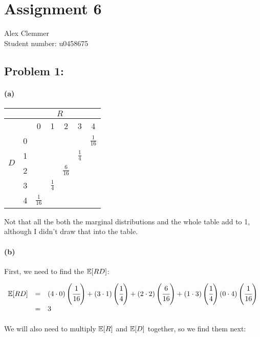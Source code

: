 \documentclass[a4paper]{article}
\begin{document}
\section*{Assignment 6}
Alex Clemmer\\
Student number: u0458675

\subsection*{Problem 1:} 

\paragraph{(a)} 

\renewcommand\arraystretch{1.5}
\begin{tabular}{ c | c | c | c | c | c | c}
& \multicolumn{6}{c}{$R$} \\
\hline
\multirow{7}{*}{$D$} & & 0 & 1 & 2 & 3 & 4 \\
\cline{2-7}
& 0 & & & & & $\frac{1}{16}$ \\
\cline{2-7}
& 1 & & & & $\frac{1}{4}$ & \\
\cline{2-7}
& 2 & & & $\frac{6}{16}$ & & \\
\cline{2-7}
& 3 & & $\frac{1}{4}$ & & & \\
\cline{2-7}
& 4 & $\frac{1}{16}$ & & & & \\
\end{tabular}

Not that all the both the marginal distributions and the whole table add to 1, although I didn't draw that into the table.

\paragraph{(b)}

First, we need to find the $\mathbb{E}[RD]$:

\begin{equation}
\begin{array}{rll}
\mathbb{E}[RD] & = & (4 \cdot 0) \left( \cfrac{1}{16} \right) + (3 \cdot 1) \left( \cfrac{1}{4} \right) + (2 \cdot 2) \left( \cfrac{6}{16} \right) + (1 \cdot 3) \left( \cfrac{1}{4} \right) (0 \cdot 4) \left( \cfrac{1}{16} \right) \\[.05in]
& = & 3 \\[.05in]
\end{array}
\end{equation}

We will also need to multiply $\mathbb{E}[R]$ and $\mathbb{E}[D]$ together, so we find them next:
\end{document}
